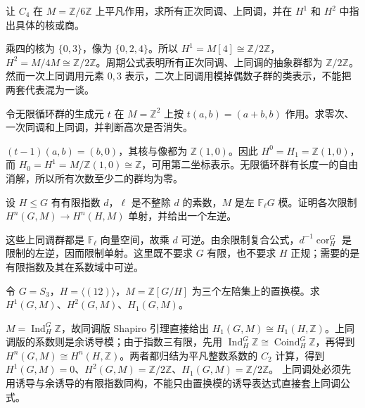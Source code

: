 \begin{exercise}\label{b4:ex:11-composite-coefficients}
	让 \(C_4\) 在 \(M=\mathbb Z/6\mathbb Z\) 上平凡作用，求所有正次同调、上同调，并在 \(H^1\) 和 \(H^2\) 中指出具体的核或商。
\end{exercise}
\begin{solution}
	乘四的核为 \(\{0,3\}\)，像为 \(\{0,2,4\}\)。所以 \(H^1=M[4]\cong\mathbb Z/2\mathbb Z\)，\(H^2=M/4M\cong\mathbb Z/2\mathbb Z\)。周期公式表明所有正次同调、上同调的抽象群都为 \(\mathbb Z/2\mathbb Z\)。然而一次上同调用元素 \(0,3\) 表示，二次上同调用模掉偶数子群的类表示，不能把两套代表混为一谈。
\end{solution}

\begin{exercise}\label{b4:ex:11-unipotent-cyclic}
	令无限循环群的生成元 \(t\) 在 \(M=\mathbb Z^2\) 上按 \(t(a,b)=(a+b,b)\) 作用。求零次、一次同调和上同调，并判断高次是否消失。
\end{exercise}
\begin{solution}
	\((t-1)(a,b)=(b,0)\)，其核与像都为 \(\mathbb Z(1,0)\)。因此 \(H^0=H_1=\mathbb Z(1,0)\)，而 \(H_0=H^1=M/\mathbb Z(1,0)\cong\mathbb Z\)，可用第二坐标表示。无限循环群有长度一的自由消解，所以所有次数至少二的群均为零。
\end{solution}

\begin{exercise}\label{b4:ex:11-restriction-prime-index}
	设 \(H\le G\) 有有限指数 \(d\)，\(\ell\) 是不整除 \(d\) 的素数，\(M\) 是左 \(\mathbb F_\ell G\) 模。证明各次限制 \(H^n(G,M)\to H^n(H,M)\) 单射，并给出一个左逆。
\end{exercise}
\begin{solution}
	这些上同调群都是 \(\mathbb F_\ell\) 向量空间，故乘 \(d\) 可逆。由余限制复合公式，\(d^{-1}\operatorname{cor}_H^G\) 是限制的左逆，因而限制单射。这里既不要求 \(G\) 有限，也不要求 \(H\) 正规；需要的是有限指数及其在系数域中可逆。
\end{solution}

\begin{exercise}\label{b4:ex:11-shapiro-permutation}
	令 \(G=S_3\)，\(H=\langle(12)\rangle\)，\(M=\mathbb Z[G/H]\) 为三个左陪集上的置换模。求 \(H^1(G,M)\)、\(H^2(G,M)\)、\(H_1(G,M)\)。
\end{exercise}
\begin{solution}
	\(M=\operatorname{Ind}_H^G\mathbb Z\)，故同调版 Shapiro 引理直接给出 \(H_1(G,M)\cong H_1(H,\mathbb Z)\)。上同调版的系数则是余诱导模；由于指数三有限，先用 \(\operatorname{Ind}_H^G\mathbb Z\cong\operatorname{Coind}_H^G\mathbb Z\)，再得到 \(H^n(G,M)\cong H^n(H,\mathbb Z)\)。两者都归结为平凡整数系数的 \(C_2\) 计算，得到 \(H^1(G,M)=0\)、\(H^2(G,M)=\mathbb Z/2\mathbb Z\)、\(H_1(G,M)=\mathbb Z/2\mathbb Z\)。 上同调处必须先用诱导与余诱导的有限指数同构，不能只由置换模的诱导表达式直接套上同调公式。
\end{solution}

